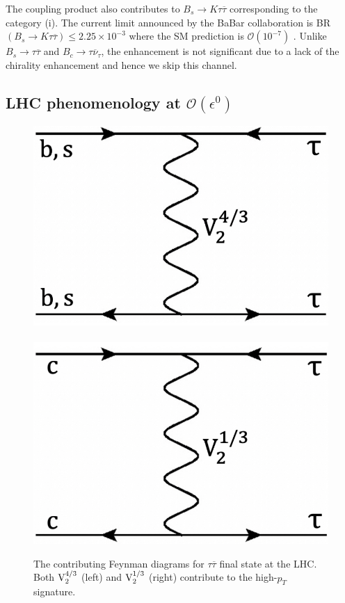 \documentclass[12pt, a4paper]{article}
\numberwithin{equation}{section} %
\newcommand{\ov}{\overline}
\newcommand{\1}{\mbox{1}\hspace{-0.25em}\mbox{l}}
\begin{document}
The coupling product also contributes to $B_s\to K \tau\ov\tau$ corresponding to the category (i).
The current limit announced by the BaBar collaboration is BR$(B_s\to K \tau\ov\tau)\le 2.25\times 10^{-3}$ \cite{BaBar:2016wgb} where the SM prediction is $\mathcal{O}(10^{-7})$ \cite{Capdevila:2017iqn}.
Unlike $B_s\to\tau\ov\tau$ and $B_c\to\tau\ov\nu_\tau$, the enhancement is not significant due to a lack of the chirality enhancement and hence we skip this channel.


\subsection{LHC phenomenology at $\mathcal{O}(\epsilon^0)$ }
\label{sec:LHC}
\begin{figure}[t]
\begin{center}
 \includegraphics[width=0.3 \textwidth]{Figs/dia_LHC_4o3.pdf}~~~~~~~~~~
  \includegraphics[width=0.3 \textwidth]{Figs/dia_LHC_1o3.pdf}
\end{center}
 \caption{
The contributing Feynman diagrams for $\tau\ov\tau$ final state at the LHC.
Both $\rm{V}^{4/3}_2$ (left) and $\rm{V}^{1/3}_2$ (right) contribute to the high-$p_T$ signature.
  \label{fig:diagrams}
 }
\end{figure}
\end{document}
